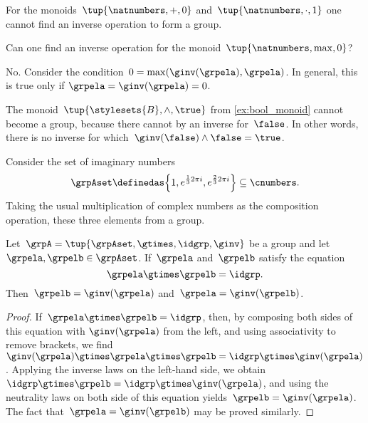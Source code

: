 \begin{example}
    For the monoids~$\tup{\natnumbers, +,0}$ and~$\tup{\natnumbers,\cdot ,1}$ one cannot find an inverse operation to form a group.
\end{example}

\begin{exercise}
    Can one find an inverse operation for the monoid~$\tup{\natnumbers,\max,0}$?
\end{exercise}
%
\begin{solution}
    No.
    Consider the condition~$0=\max(\ginv(\grpela),\grpela)$.
    In general, this is true only if $\grpela=\ginv(\grpela)=0$.
\end{solution}

\begin{example}
    The monoid~$\tup{\stylesets{B},\wedge, \true}$ from \cref{ex:bool_monoid} cannot become a group, because there cannot by an inverse for~$\false$.
    In other words, there is no inverse for which~$\ginv(\false)\wedge \false=\true$.
\end{example}
\begin{example}
    \label{grp-order-three}
    Consider the set of imaginary numbers
    \begin{equation*}
        \grpAset \definedas \Big\{ 1, e^{\frac{1}{3}2\pi i}, e^{\frac{2 }{3}2\pi i}  \Big\} \subseteq \cnumbers.
    \end{equation*}
    Taking the usual multiplication of complex numbers as the composition operation, these three elements from a group.
\end{example}


\begin{lemma}
    \label{lem:inv-op-unique}
    Let~$\grpA = \tup{ \grpAset, \gtimes, \idgrp, \ginv }$ be a group and let~$\grpela, \grpelb \in \grpAset$.
    If~$\grpela$ and~$\grpelb$ satisfy the equation
    \begin{equation}
        \grpela \gtimes \grpelb = \idgrp.
    \end{equation}
    Then~$\grpelb = \ginv( \grpela )$ and~$\grpela = \ginv(\grpelb)$.
\end{lemma}

\begin{proof}
    If~$\grpela \gtimes \grpelb = \idgrp$, then, by composing both sides of this equation with $\ginv(\grpela)$ from the left, and using associativity to remove brackets, we find~$\ginv(\grpela) \gtimes \grpela \gtimes \grpelb = \idgrp \gtimes \ginv(\grpela)$.
    Applying the inverse laws on the left-hand side, we obtain~$\idgrp \gtimes \grpelb = \idgrp \gtimes \ginv(\grpela)$, and using the neutrality laws on both side of this equation yields~$\grpelb =  \ginv(\grpela)$.
    The fact that~$\grpela = \ginv(\grpelb)$ may be proved similarly.
\end{proof}

